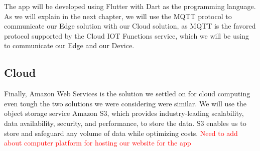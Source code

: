 The app will be developed using Flutter with Dart as the programming language.\\
As we will explain in the next chapter, we will use the MQTT protocol to communicate our Edge solution with our Cloud solution, as MQTT is the favored protocol supported by the Cloud IOT Functions service, which we will be using to communicate our Edge and our Device.

\subsection{Cloud}
Finally, Amazon Web Services is the solution we settled on for cloud computing even tough the two solutions we were considering were similar. We will use the object storage service Amazon S3, which provides industry-leading scalability, data availability, security, and performance, to store the data. S3 enables us to store and safeguard any volume of data while optimizing costs. 
\textcolor{red}{Need to add about computer platform for hosting our website for the app}